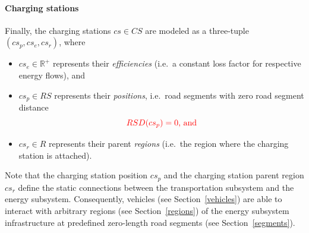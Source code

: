 \paragraph{Charging stations}
\label{charging_stations}

Finally, the charging stations $cs \in CS$ are modeled as a three-tuple $(cs_p, cs_e, cs_r)$, where
\begin{itemize}
	\item $cs_e \in \mathbb{R}^+$ represents their \textit{efficiencies} (i.e.\ a constant loss factor for respective energy flows), and
	\item $cs_p \in RS$ represents their \textit{positions}, i.e.\ road segments with zero road segment distance
	\[
		\textcolor{red}{ RSD(cs_p) = 0 \textrm{, and} }
	\]
	\item $cs_r \in R$ represents their parent \textit{regions} (i.e.\ the region where the charging station is attached).
\end{itemize}
Note that the charging station position $cs_p$ and the charging station parent region $cs_r$ define the static connections between the transportation subsystem and the energy subsystem. Consequently, vehicles (see Section~\ref{vehicles}) are able to interact with arbitrary regions (see Section~\ref{regions}) of the energy subsystem infrastructure at predefined zero-length road segments (see Section~\ref{segments}).
